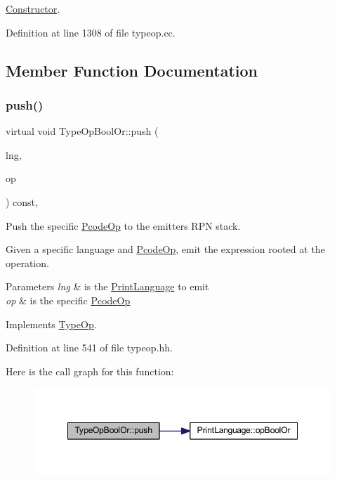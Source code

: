 \mbox{\hyperlink{class_constructor}{Constructor}}. 



Definition at line 1308 of file typeop.\+cc.



\subsection{Member Function Documentation}
\mbox{\label{class_type_op_bool_or_a6bd41aa2fac74f988a531025d28edca5}} 
\subsubsection{\texorpdfstring{push()}{push()}}
{\footnotesize\ttfamily virtual void Type\+Op\+Bool\+Or\+::push (\begin{DoxyParamCaption}\item[{\mbox{\hyperlink{class_print_language}{Print\+Language}} $\ast$}]{lng,  }\item[{const \mbox{\hyperlink{class_pcode_op}{Pcode\+Op}} $\ast$}]{op }\end{DoxyParamCaption}) const\hspace{0.3cm}{\ttfamily [inline]}, {\ttfamily [virtual]}}



Push the specific \mbox{\hyperlink{class_pcode_op}{Pcode\+Op}} to the emitter\textquotesingle{}s R\+PN stack. 

Given a specific language and \mbox{\hyperlink{class_pcode_op}{Pcode\+Op}}, emit the expression rooted at the operation. 
\begin{DoxyParams}{Parameters}
{\em lng} & is the \mbox{\hyperlink{class_print_language}{Print\+Language}} to emit \\
\hline
{\em op} & is the specific \mbox{\hyperlink{class_pcode_op}{Pcode\+Op}} \\
\hline
\end{DoxyParams}


Implements \mbox{\hyperlink{class_type_op_ac9c9544203ed74dabe6ac662b653b2af}{Type\+Op}}.



Definition at line 541 of file typeop.\+hh.

Here is the call graph for this function\+:
\nopagebreak
\begin{figure}[H]
\begin{center}
\leavevmode
\includegraphics[width=348pt]{class_type_op_bool_or_a6bd41aa2fac74f988a531025d28edca5_cgraph}
\end{center}
\end{figure}


